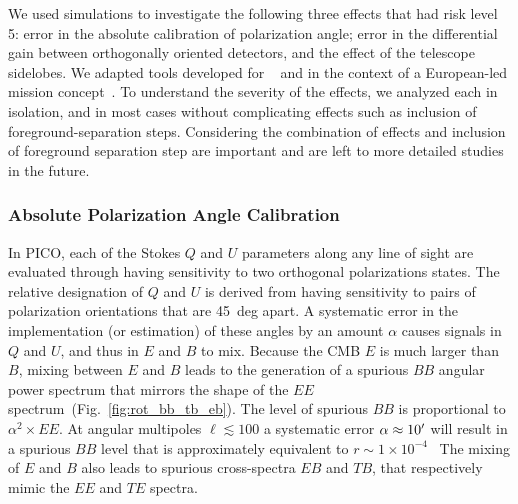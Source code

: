 \documentclass[PICOReport.tex]{subfiles}
\begin{document}
We used simulations to investigate the following three effects that had risk level 5: error in the absolute calibration of polarization angle; error in the differential gain between orthogonally oriented detectors, and the effect of the telescope sidelobes. We adapted tools developed for \planck~\cite{plank2015_xii_focalplane} and in the context of a European-led mission concept~\citep{core_systematics}. To understand the severity of the effects, we analyzed each in isolation, and in most cases without complicating effects such as inclusion of foreground-separation steps. Considering the combination of effects and inclusion of foreground separation step are important and are left to more detailed studies in the future. 


%



\subsubsection{Absolute Polarization Angle Calibration}
\label{sec:angle}

In PICO, each of the Stokes $Q$ and $U$ parameters along any line of sight are evaluated through having sensitivity to two orthogonal polarizations states. The relative designation of $Q$ and $U$ is derived from having sensitivity to pairs of polarization orientations that are 45~deg apart. A systematic error in the implementation (or estimation) of these angles by an amount $\alpha$ causes signals in $Q$ and $U$, and thus in $E$ and $B$ to mix. Because the CMB $E$ is much larger than $B$, mixing between $E$ and $B$ leads to the generation of a spurious $BB$ angular power spectrum that mirrors the shape of the $EE$ spectrum~(Fig.~\ref{fig:rot_bb_tb_eb}). The level of spurious $BB$ is proportional to $\alpha^{2} \times EE$. At angular multipoles $\ell \lesssim 100$ a systematic error $\alpha\approx 10'$ will result in a spurious $BB$ level that is approximately equivalent to $r \sim 1\times10^{-4}$~\citep{shimon2008,Aumont+2018}  The mixing of $E$ and $B$ also leads to spurious cross-spectra $EB$ and $TB$, that respectively mimic the $EE$ and $TE$ spectra. 
\end{document}
